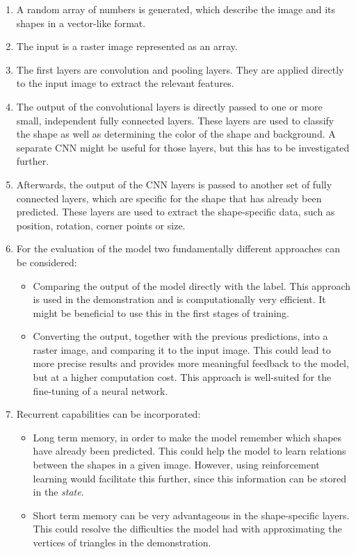 \documentclass[12pt, a4paper, titlepage]{report}
\begin{document}
\begin{enumerate}[label=\Roman*.]
   \item A random array of numbers is generated, which describe the image and its shapes in a vector-like format.
   \item The input is a raster image represented as an array.
   \item The first layers are convolution and pooling layers. They are applied directly to the input image to extract the relevant features.
   \item The output of the convolutional layers is directly passed to one or more small, independent fully connected layers. These layers are used to classify the shape as well as determining the color of the shape and background. A separate CNN might be useful for those layers, but this has to be investigated further.
   \item Afterwards, the output of the CNN layers is passed to another set of fully connected layers, which are specific for the shape that has already been predicted. These layers are used to extract the shape-specific data, such as position, rotation, corner points or size.

   \item For the evaluation of the model two fundamentally different approaches can be considered:
      \begin{itemize}
         \item Comparing the output of the model directly with the label. This approach is used in the demonstration and is computationally very efficient. It might be beneficial to use this in the first stages of training.
         \item Converting the output, together with the previous predictions, into a raster image, and comparing it to the input image. This could lead to more precise results and provides more meaningful feedback to the model, but at a higher computation cost. This approach is well-suited for the fine-tuning of a neural network.
      \end{itemize}

   \item Recurrent capabilities can be incorporated:
      \begin{itemize}
         \item Long term memory, in order to make the model remember which shapes have already been predicted. This could help the model to learn relations between the shapes in a given image. However, using reinforcement learning would facilitate this further, since this information can be stored in the \emph{state}.
         \item Short term memory can be very advantageous in the shape-specific layers. This could resolve the difficulties the model had with approximating the vertices of triangles in the demonstration.
      \end{itemize}
\end{enumerate}
\end{document}
